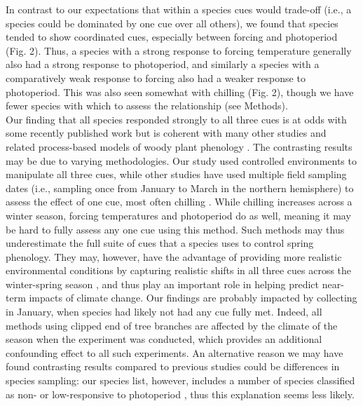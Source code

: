 \documentclass[11pt]{article}
\begin{document}
In contrast to our expectations that within a species cues would trade-off (i.e., a species could be dominated by one cue over all others), we found that species tended to show coordinated cues, especially between forcing and photoperiod (Fig. 2). Thus, a species with a strong response to forcing temperature generally also had a strong response to photoperiod, and similarly a species with a comparatively weak response to forcing also had a weaker response to photoperiod. This was also seen somewhat with chilling (Fig. 2), though we have fewer species with which to assess the relationship (see Methods). \\

Our finding that all species responded strongly to all three cues is at odds with some recently published work \cite{Basler:2012aa,zohner2016ncc} but is coherent with many other studies \cite[e.g.,][]{Worrall:1967aa,Heide:1993b} and related process-based models of woody plant phenology \cite{Chuine:2000,chuine2016}. The contrasting results may be due to varying methodologies. Our study used controlled environments to manipulate all three cues, while other studies have used multiple field sampling dates (i.e., sampling once from January to March in the northern hemisphere) to assess the effect of one cue, most often chilling \cite{weinberger,laube2014gcb,zohner2017}. While chilling increases across a winter season, forcing temperatures and photoperiod do as well, meaning it may be hard to fully assess any one cue using this method. Such methods may thus underestimate the full suite of cues that a species uses to control spring phenology. They may, however, have the advantage of providing more realistic environmental conditions by capturing realistic shifts in all three cues across the winter-spring season \cite{Basler:2012aa}, and thus play an important role in helping predict near-term impacts of climate change. Our findings are probably impacted by collecting in January, when species had likely not had any cue fully met. Indeed, all methods using clipped end of tree branches are affected by the climate of the season when the experiment was conducted, which provides an additional confounding effect to all such experiments. An alternative reason we may have found contrasting results compared to previous studies could be differences in species sampling: our species list, however, includes a number of species classified as non- or low-responsive to photoperiod \cite[i.e., \emph{Alnus incana, Aronia melanocarpa}][]{zohner2016ncc}, thus this explanation seems less likely. \\
\end{document}
